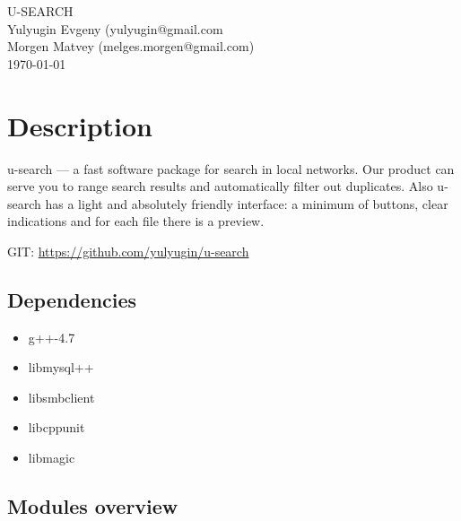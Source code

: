 \documentclass[10pt, oneside, a4paper]{scrbook}
\begin{document}
\hypersetup{pageanchor=false, linkcolor=black, filecolor=black, citecolor=black, urlcolor=blue, pdfauthor = Evgeny Yulyugin, pdftitle=mipt-smb-search guide}

\begin{titlepage}
\vspace*{7cm}
\begin{center}
{\Large U-\/\-S\-E\-A\-R\-C\-H }\\
\vspace*{1cm}
{\large Yulyugin Evgeny (yulyugin@gmail.com}\\
{\large Morgen Matvey (melges.morgen@gmail.com)}\\
\vspace*{0.5cm}
{\small \today}\\
\end{center}
\end{titlepage}
\clearpage
{}
\tableofcontents
\clearpage
{}
\hypersetup{pageanchor=true,citecolor=blue}

\chapter{Description}

u-search --- a fast software package for search in local networks. Our product can serve you to range search results and automatically filter out duplicates. Also u-search has a light and absolutely friendly interface: a minimum of buttons, clear indications and for each file there is a preview.

GIT: \url{https://github.com/yulyugin/u-search}

\section{Dependencies}

\begin{itemize}
  \item g++-4.7
  \item libmysql++
  \item libsmbclient
  \item libcppunit
  \item libmagic
\end{itemize}

\section{Modules overview}
\end{document}
